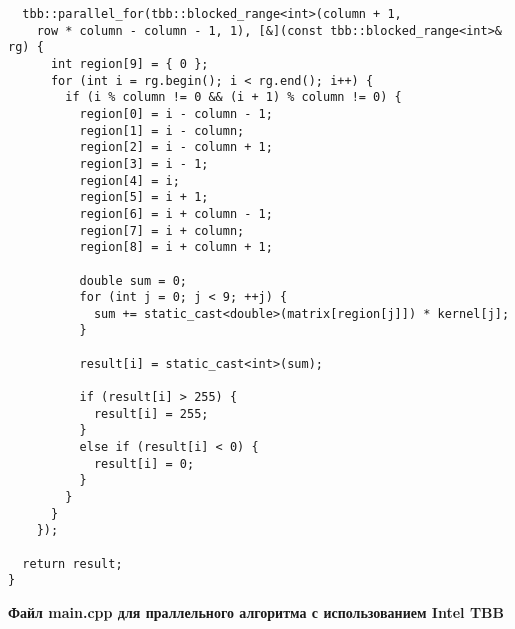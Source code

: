 \documentclass{report}
\begin{document}
\begin{lstlisting}
  tbb::parallel_for(tbb::blocked_range<int>(column + 1,
    row * column - column - 1, 1), [&](const tbb::blocked_range<int>& rg) {
      int region[9] = { 0 };
      for (int i = rg.begin(); i < rg.end(); i++) {
        if (i % column != 0 && (i + 1) % column != 0) {
          region[0] = i - column - 1;
          region[1] = i - column;
          region[2] = i - column + 1;
          region[3] = i - 1;
          region[4] = i;
          region[5] = i + 1;
          region[6] = i + column - 1;
          region[7] = i + column;
          region[8] = i + column + 1;

          double sum = 0;
          for (int j = 0; j < 9; ++j) {
            sum += static_cast<double>(matrix[region[j]]) * kernel[j];
          }

          result[i] = static_cast<int>(sum);

          if (result[i] > 255) {
            result[i] = 255;
          }
          else if (result[i] < 0) {
            result[i] = 0;
          }
        }
      }
    });

  return result;
}
\end{lstlisting}
\newpage
\textbf{ Файл main.cpp для праллельного алгоритма с использованием Intel TBB }
\end{document}
